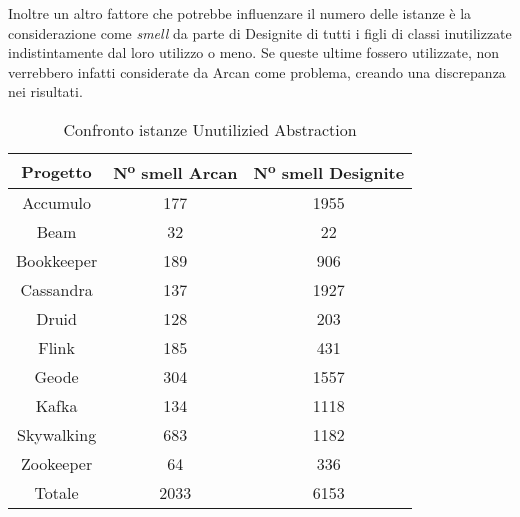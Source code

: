         Inoltre un altro fattore che potrebbe influenzare il numero delle istanze è la considerazione come \textit{smell} da parte di Designite di tutti i figli di classi inutilizzate indistintamente dal loro utilizzo o meno. Se queste ultime fossero utilizzate, non verrebbero infatti considerate da Arcan come problema, creando una discrepanza nei risultati. 

    
        \begin{table}[h]
            \centering
            \begin{tabular}{|c|c|c|}
                \hline
                \textbf{Progetto} & \textbf{N\textsuperscript{o} smell Arcan} & \textbf{N\textsuperscript{o} smell Designite} \\
                \hline
                Accumulo & 177 & 1955 \\
                Beam & 32 & 22\\
                Bookkeeper & 189 & 906\\
                Cassandra & 137 & 1927\\
                Druid & 128 & 203\\
                Flink & 185 & 431\\
                Geode & 304 & 1557\\
                Kafka & 134 & 1118\\
                Skywalking & 683 & 1182\\
                Zookeeper & 64 & 336\\
                \hline
                Totale & 2033 & 6153\\
                \hline
            \end{tabular}
            \caption{Confronto istanze Unutilizied Abstraction}
            \label{tab:caption}
        \end{table}